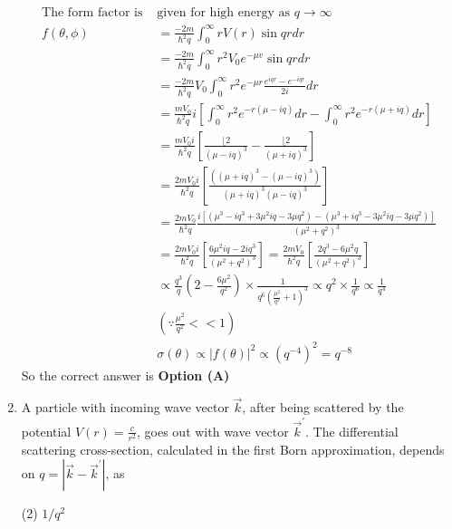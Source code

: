 \begin{enumerate}
\begin{answer}
	$$
\begin{aligned}
\text{The form factor is }&\text{given for high energy as $q \rightarrow \infty$}\\
f(\theta, \phi)&=\frac{-2 m}{\hbar^{2} q} \int_{0}^{\infty} r V(r) \sin q r d r\\&=\frac{-2 m}{\hbar^{2} q} \int_{0}^{\infty} r^{2} V_{0} e^{-\mu v} \sin q r d r\\
&=\frac{-2 m}{\hbar^{2} q} V_{0} \int_{0}^{\infty} r^{2} e^{-\mu r} \frac{e^{i q r}-e^{-i q r}}{2 i} d r\\&=\frac{m V_{0}}{\hbar^{2} q} i\left[\int_{0}^{\infty} r^{2} e^{-r(\mu-i q)} d r-\int_{0}^{\infty} r^{2} e^{-r(\mu+i q)} d r\right]\\
&=\frac{m V_{0} i}{\hbar^{2} q}\left[\frac{\lfloor 2}{(\mu-i q)^{3}}-\frac{\lfloor 2}{(\mu+i q)^{3}}\right]\\&=\frac{2 m V_{0} i}{\hbar^{2} q}\left[\frac{\left((\mu+i q)^{3}-(\mu-i q)^{3}\right)}{(\mu+i q)^{3}(\mu-i q)^{3}}\right]\\
&=\frac{2 m V_{0}}{\hbar^{2} q} \frac{i\left[\left(\mu^{3}-i q^{3}+3 \mu^{2} i q-3 \mu q^{2}\right)-\left(\mu^{3}+i q^{3}-3 \mu^{2} i q-3 \mu q^{2}\right)\right]}{\left(\mu^{2}+q^{2}\right)^{3}}\\
&=\frac{2 m V_{0} i}{\hbar^{2} q}\left[\frac{6 \mu^{2} i q-2 i q^{3}}{\left(\mu^{2}+q^{2}\right)^{3}}\right]=\frac{2 m V_{0}}{\hbar^{2} q}\left[\frac{2 q^{3}-6 \mu^{2} q}{\left(\mu^{2}+q^{2}\right)^{3}}\right]\\
&\propto \frac{q^{3}}{q}\left(2-\frac{6 \mu^{2}}{q^{2}}\right) \times \frac{1}{q^{6}\left(\frac{\mu^{2}}{q^{2}}+1\right)^{3}} \propto q^{2} \times \frac{1}{q^{6}} \propto \frac{1}{q^{4}} \\&\left(\because \frac{\mu^{2}}{q^{2}}<<1\right)\\
&\sigma(\theta) \propto|f(\theta)|^{2} \propto\left(q^{-4}\right)^{2}=q^{-8}
\end{aligned}
$$
So the correct answer is \textbf{Option (A)}
\end{answer}
\item A particle with incoming wave vector $\vec{k}$, after being scattered by the potential $V(r)=\frac{c}{r^{2}}$, goes out with wave vector $\vec{k}^{\prime}$. The differential scattering cross-section, calculated in the first Born approximation, depends on $q=\left|\vec{k}-\vec{k}^{\prime}\right|$, as
{}
\begin{tasks}(2)
\task[\textbf{A.}] $1 / q^{2}$

\end{tasks}
\end{enumerate}
